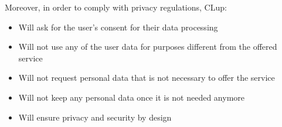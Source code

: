 Moreover, in order to comply with privacy regulations\textsuperscript{\cite{gdpr}}, CLup:
\begin{itemize}[itemsep=-1mm, topsep=-1mm]
	\item Will ask for the user's consent for their data processing
	\item Will not use any of the user data for purposes different from the offered service
	\item Will not request personal data that is not necessary to offer the service
	\item Will not keep any personal data once it is not needed anymore
	\item Will ensure privacy and security by design
\end{itemize}

